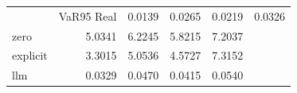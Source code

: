 \begin{tabular}{lrrrr}
\toprule
 & VaR95%
\midrule
Real & 0.0139 & 0.0265 & 0.0219 & 0.0326 \\
zero & 5.0341 & 6.2245 & 5.8215 & 7.2037 \\
explicit & 3.3015 & 5.0536 & 4.5727 & 7.3152 \\
llm & 0.0329 & 0.0470 & 0.0415 & 0.0540 \\
\bottomrule
\end{tabular}
